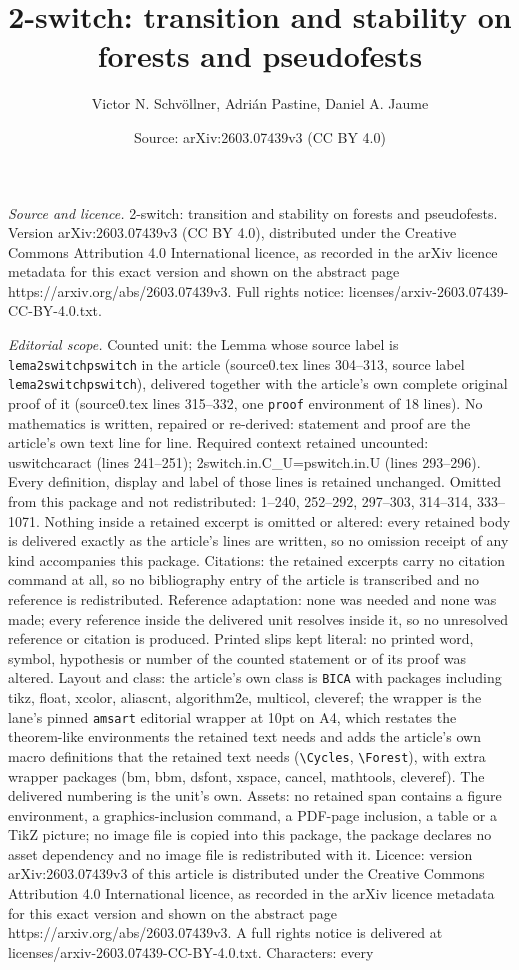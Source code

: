 \documentclass[10pt,a4paper]{amsart}
\title[2-switch: transition and stability on forests and pseudofest]{2-switch: transition and stability on forests and pseudofests}
\author{Victor N. Schv\"ollner, Adri\'an Pastine, Daniel A. Jaume}
\date{Source: arXiv:2603.07439v3 (CC BY 4.0)}
\begin{document}
\maketitle

\noindent\emph{Source and licence.} 2-switch: transition and stability on forests and pseudofests. Version arXiv:2603.07439v3 (CC BY 4.0), distributed under the Creative Commons Attribution 4.0 International licence, as recorded in the arXiv licence metadata for this exact version and shown on the abstract page https://arxiv.org/abs/2603.07439v3. Full rights notice: licenses/arxiv-2603.07439-CC-BY-4.0.txt.\par\smallskip

\noindent\textit{Editorial scope.} Counted unit: the Lemma whose source label is \texttt{lema2switchpswitch} in the article (source0.tex lines 304--313, source label \texttt{lema2switchpswitch}), delivered together with the article's own complete original proof of it (source0.tex lines 315--332, one \texttt{proof} environment of 18 lines). No mathematics is written, repaired or re-derived: statement and proof are the article's own text line for line. Required context retained uncounted: uswitchcaract (lines 241--251); 2switch.in.C\_U=pswitch.in.U (lines 293--296). Every definition, display and label of those lines is retained unchanged. Omitted from this package and not redistributed: 1--240, 252--292, 297--303, 314--314, 333--1071. Nothing inside a retained excerpt is omitted or altered: every retained body is delivered exactly as the article's lines are written, so no omission receipt of any kind accompanies this package. Citations: the retained excerpts carry no citation command at all, so no bibliography entry of the article is transcribed and no reference is redistributed. Reference adaptation: none was needed and none was made; every reference inside the delivered unit resolves inside it, so no unresolved reference or citation is produced. Printed slips kept literal: no printed word, symbol, hypothesis or number of the counted statement or of its proof was altered. Layout and class: the article's own class is \texttt{BICA} with packages including tikz, float, xcolor, aliascnt, algorithm2e, multicol, cleveref; the wrapper is the lane's pinned \texttt{amsart} editorial wrapper at 10pt on A4, which restates the theorem-like environments the retained text needs and adds the article's own macro definitions that the retained text needs (\texttt{\textbackslash Cycles}, \texttt{\textbackslash Forest}), with extra wrapper packages (bm, bbm, dsfont, xspace, cancel, mathtools, cleveref). The delivered numbering is the unit's own. Assets: no retained span contains a figure environment, a graphics-inclusion command, a PDF-page inclusion, a table or a TikZ picture; no image file is copied into this package, the package declares no asset dependency and no image file is redistributed with it. Licence: version arXiv:2603.07439v3 of this article is distributed under the Creative Commons Attribution 4.0 International licence, as recorded in the arXiv licence metadata for this exact version and shown on the abstract page https://arxiv.org/abs/2603.07439v3. A full rights notice is delivered at licenses/arxiv-2603.07439-CC-BY-4.0.txt. Characters: every 
\end{document}
